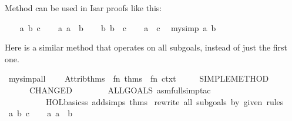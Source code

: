 \begin{isabellebody}
\begin{isamarkuptext}
  \medskip Method \hyperlink{method.my-simp}{\mbox{}} can be used in Isar proofs like
  this:%
\end{isamarkuptext}%
\isamarkuptrue%
\isamarkupfalse%
\isanewline
%
\isadelimproof
\ \ %
\endisadelimproof
%
\isatagproof
{}\isamarkupfalse%
\ a\ b\ c\isanewline
\ \ \isamarkupfalse%
\ a{\isacharcolon}\ {\isachardoublequoteopen}a\ {\isacharequal}\ b{\isachardoublequoteclose}\isanewline
\ \ \isamarkupfalse%
\ b{\isacharcolon}\ {\isachardoublequoteopen}b\ {\isacharequal}\ c{\isachardoublequoteclose}\isanewline
\ \ \isamarkupfalse%
\ {\isachardoublequoteopen}a\ {\isacharequal}\ c{\isachardoublequoteclose}\ \isamarkupfalse%
\ {\isacharparenleft}my{\isacharunderscore}simp\ a\ b{\isacharparenright}\isanewline
{}\isamarkupfalse%
%
\endisatagproof
{\isafoldproof}%
%
\isadelimproof
%
\endisadelimproof
%
\begin{isamarkuptext}%
Here is a similar method that operates on all subgoals,
  instead of just the first one.%
\end{isamarkuptext}%
\isamarkuptrue%
%
\isadelimML
%
\endisadelimML
%
\isatagML
{}\isamarkupfalse%
\ my{\isacharunderscore}simp{\isacharunderscore}all\ {\isacharequal}\ {\isacharverbatimopen}\isanewline
\ \ Attrib{\isachardot}thms\ {\isachargreater}{\isachargreater}\ {\isacharparenleft}fn\ thms\ {\isacharequal}{\isachargreater}\ fn\ ctxt\ {\isacharequal}{\isachargreater}\isanewline
\ \ \ \ SIMPLE{\isacharunderscore}METHOD\isanewline
\ \ \ \ \ \ {\isacharparenleft}CHANGED\isanewline
\ \ \ \ \ \ \ \ {\isacharparenleft}ALLGOALS\ {\isacharparenleft}asm{\isacharunderscore}full{\isacharunderscore}simp{\isacharunderscore}tac\isanewline
\ \ \ \ \ \ \ \ \ \ {\isacharparenleft}HOL{\isacharunderscore}basic{\isacharunderscore}ss\ addsimps\ thms{\isacharparenright}{\isacharparenright}{\isacharparenright}{\isacharparenright}{\isacharparenright}\isanewline
{\isacharverbatimclose}\ {\isachardoublequoteopen}rewrite\ all\ subgoals\ by\ given\ rules{\isachardoublequoteclose}%
\endisatagML
{\isafoldML}%
%
\isadelimML
%
\endisadelimML
\isanewline
\isanewline
{}\isamarkupfalse%
\isanewline
%
\isadelimproof
\ \ %
\endisadelimproof
%
\isatagproof
{}\isamarkupfalse%
\ a\ b\ c\isanewline
\ \ \isamarkupfalse%
\ a{\isacharcolon}\ {\isachardoublequoteopen}a\ {\isacharequal}\ b{\isachardoublequoteclose}\isanewline

\end{isabellebody}

